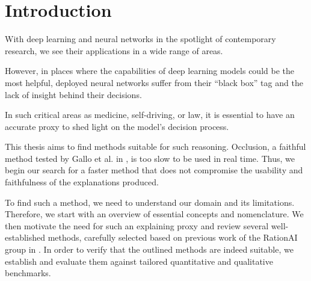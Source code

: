 \chapter{Introduction}\label{chap:introduction}

With deep learning and neural networks in the spotlight of contemporary research, we see their applications in a wide range of areas.

However, in places where the capabilities of deep learning models could be the most helpful, deployed neural networks suffer from their ``black box'' tag and the lack of insight behind their decisions.

In such critical areas as medicine, self-driving, or law, it is essential to have an accurate proxy to shed light on the model's decision process.

This thesis aims to find methods suitable for such reasoning.
Occlusion, a faithful method tested by Gallo et al. in \cite{gallo}, is too slow to be used in real time.
Thus, we begin our search for a faster method that does not compromise the usability and faithfulness of the explanations produced.

To find such a method, we need to understand our domain and its limitations.
Therefore, we start with an overview of essential concepts and nomenclature.
We then motivate the need for such an explaining proxy and review several well-established methods, carefully selected based on previous work of the RationAI group in  \cite{gallo, bajger-grad-cam, krajnansky-grad-cam, hruska-grad-cam}.
In order to verify that the outlined methods are indeed suitable, we establish and evaluate them against tailored quantitative and qualitative benchmarks.

